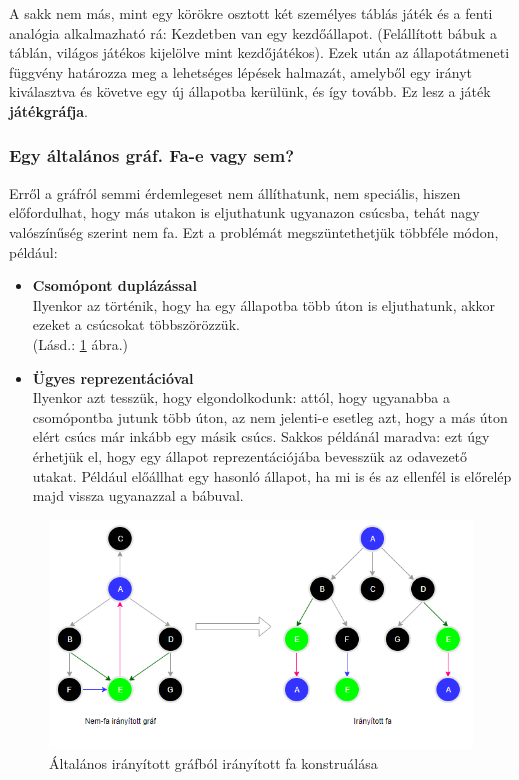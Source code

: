 \documentclass[twoside, a4paper, 12pt]{article}
\begin{document}
A sakk nem más, mint egy körökre osztott két személyes táblás játék és a fenti analógia alkalmazható rá: Kezdetben van egy kezdőállapot. (Felállított bábuk a táblán, világos játékos kijelölve mint kezdőjátékos). Ezek után az állapotátmeneti függvény határozza meg a lehetséges lépések halmazát, amelyből egy irányt kiválasztva és követve egy új állapotba kerülünk, és így tovább. Ez lesz a játék \textbf{játékgráfja}.

\subsubsection{Egy általános gráf. Fa-e vagy sem?}
Erről a gráfról semmi érdemlegeset nem állíthatunk, nem speciális, hiszen előfordulhat, hogy más utakon is eljuthatunk ugyanazon csúcsba, tehát nagy valószínűség szerint nem fa. Ezt a problémát megszüntethetjük többféle módon, például: 

\begin{itemize}
	\item \textbf{Csomópont duplázással} \\
	Ilyenkor az történik, hogy ha egy állapotba több úton is eljuthatunk, akkor ezeket a csúcsokat többszörözzük. \\
	(Lásd.: \ref{fig:game-graph-transformation} ábra.)
	
	\item \textbf{Ügyes reprezentációval} \\
	Ilyenkor azt tesszük, hogy elgondolkodunk: attól, hogy ugyanabba a csomópontba jutunk több úton, az nem jelenti-e esetleg azt, hogy a más úton elért csúcs már inkább egy másik csúcs. Sakkos példánál maradva: ezt úgy érhetjük el, hogy egy állapot reprezentációjába bevesszük az odavezető utakat. Például előállhat egy hasonló állapot, ha mi is és az ellenfél is előrelép majd vissza ugyanazzal a bábuval.
\end{itemize}

\begin{figure}[htbp]
	\centering
	\includegraphics[width=1.0\textwidth]{img/game-graph-transformation.png}
	\caption{Általános irányított gráfból irányított fa konstruálása}
	\label{fig:game-graph-transformation}
\end{figure}
\end{document}

